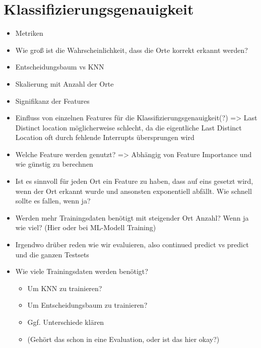 \section{Klassifizierungsgenauigkeit}
\begin{itemize}
    \item Metriken
    \item Wie groß ist die Wahrscheinlichkeit, dass die Orte korrekt erkannt werden?
    \item Entscheidungsbaum vs KNN
    \item Skalierung mit Anzahl der Orte
    \item Signifikanz der Features
    \item Einfluss von einzelnen Features für die Klassifizierungsgenauigkeit(?) => Last Distinct location möglicherweise schlecht, da die eigentliche Last Distinct Location oft durch fehlende Interrupts übersprungen wird
    \item Welche Feature werden genutzt? => Abhängig von Feature Importance und wie günstig zu berechnen
    \item Ist es sinnvoll für jeden Ort ein Feature zu haben, dass auf eins gesetzt wird, wenn der Ort erkannt wurde und ansonsten exponentiell abfällt. Wie schnell sollte es fallen, wenn ja?
    \item Werden mehr Trainingsdaten benötigt mit steigender Ort Anzahl? Wenn ja wie viel? (Hier oder bei ML-Modell Training)
    \item Irgendwo drüber reden wie wir evaluieren, also continued predict vs predict und die ganzen Testsets
    \item Wie viele Trainingsdaten werden benötigt?
    \begin{itemize}
        \item Um KNN zu trainieren?
        \item Um Entscheidungsbaum zu trainieren?
        \item Ggf. Unterschiede klären
        \item (Gehört das schon in eine Evaluation, oder ist das hier okay?)
    \end{itemize}
\end{itemize}
